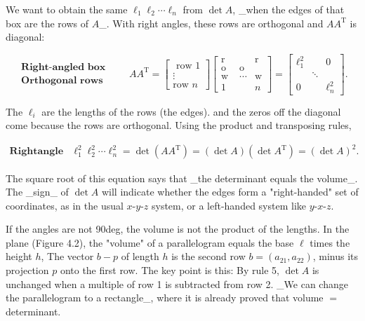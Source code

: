 We want to obtain the same \(\ell_{1}\ell_{2}\cdots\ell_{n}\) from \(\det A\), _when the edges of that box are the rows of \(A\)_. With right angles, these rows are orthogonal and \(AA^{\mathrm{T}}\) is diagonal:

\[\begin{array}{ll}\textbf{Right-angled box}\\ \textbf{Orthogonal rows}\end{array}\qquad AA^{\mathrm{T}}=\begin{bmatrix}\text{ row 1}\\ \vdots\\ \text{row }n\end{bmatrix}\begin{bmatrix}\text{r}&&\text{r}\\ \text{o}&\text{o}\\ \text{w }&\cdots&\text{w}\\ 1&&n\end{bmatrix}=\begin{bmatrix}\ell_{1}^{2}&&0\\ &\ddots&\\ 0&&\ell_{n}^{2}\end{bmatrix}.\]

The \(\ell_{i}\) are the lengths of the rows (the edges). and the zeros off the diagonal come because the rows are orthogonal. Using the product and transposing rules,

\[\begin{array}{ll}\textbf{Rightangle case}&\ell_{1}^{2}\ell_{2}^{2}\cdots\ell_ {n}^{2}=\det(AA^{\mathrm{T}})=(\det A)(\det A^{\mathrm{T}})=(\det A)^{2}.\end{array}\]

The square root of this equation says that _the determinant equals the volume_. The _sign_ of \(\det A\) will indicate whether the edges form a "right-handed" set of coordinates, as in the usual \(x\)-\(y\)-\(z\) system, or a left-handed system like \(y\)-\(x\)-\(z\).

If the angles are not 90deg, the volume is not the product of the lengths. In the plane (Figure 4.2), the "volume" of a parallelogram equals the base \(\ell\) times the height \(h\), The vector \(b-p\) of length \(h\) is the second row \(b=(a_{21},a_{22})\), minus its projection \(p\) onto the first row. The key point is this: By rule 5, \(\det A\) is unchanged when a multiple of row 1 is subtracted from row 2. _We can change the parallelogram to a rectangle_, where it is already proved that volume \(=\) determinant.

